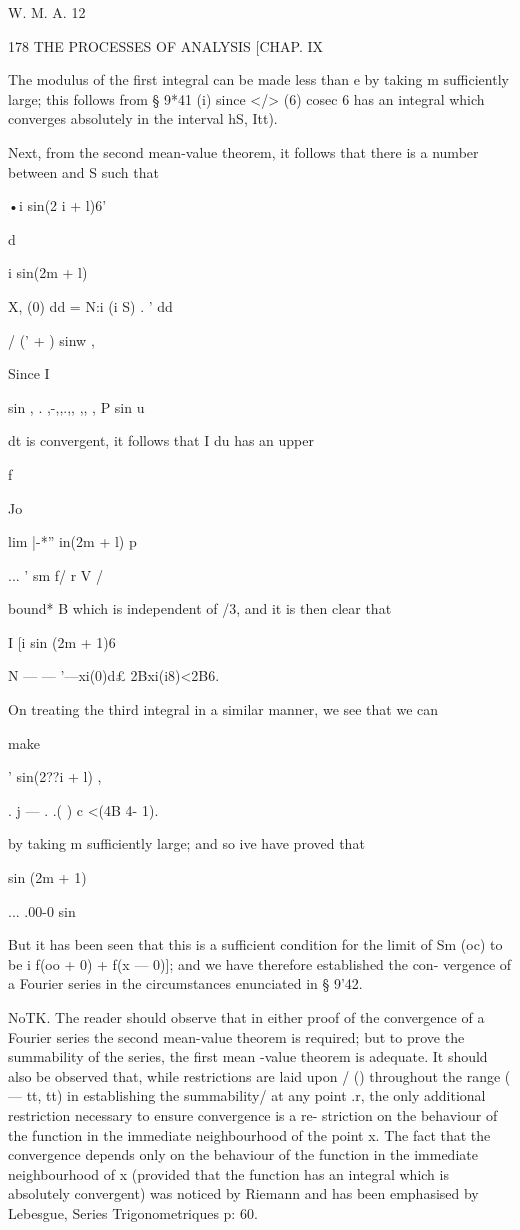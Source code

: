 W. M. A. 12

178 THE PROCESSES OF ANALYSIS [CHAP. IX

The modulus of the first integral can be made less than e by taking m
sufficiently large; this follows from § 9*41 (i) since </> (6) cosec
6 has an integral which converges absolutely in the interval hS, Itt).

Next, from the second mean-value theorem, it follows that there is a
number between and S such that

•i sin(2 i + l)6'

d

i sin(2m + l)

X, (0) dd = N:i (i S) . ' dd

  / (' + ) sinw ,

Since I

sin , . ,-,,.,, ,, , P sin u

dt is convergent, it follows that I du has an upper

f

Jo

lim |-*'' in(2m + l) p

... ' sm f/ r V /

bound* B which is independent of /3, and it is then clear that

I [i sin (2m + 1)6

N — — '—xi(0)d£ 2Bxi(i8)<2B6.

On treating the third integral in a similar manner, we see that we can

make

  ' sin(2??i + l) ,

. j — . .( ) c <(4B 4- 1).

by taking m sufficiently large; and so ive have proved that

sin (2m + 1)

... .00-0 sin

But it has been seen that this is a sufficient condition for the limit
of Sm (oc) to be i f(oo + 0) + f(x — 0)]; and we have therefore
established the con- vergence of a Fourier series in the circumstances
enunciated in § 9'42.

NoTK. The reader should observe that in either proof of the
convergence of a Fourier series the second mean-value theorem is
required; but to prove the summability of the series, the first mean
-value theorem is adequate. It should also be observed that, while
restrictions are laid upon / () throughout the range ( — tt, tt) in
establishing the summability/ at any point .r, the only additional
restriction necessary to ensure convergence is a re- striction on the
behaviour of the function in the immediate neighbourhood of the point
x. The fact that the convergence depends only on the behaviour of the
function in the immediate neighbourhood of x (provided that the
function has an integral which is absolutely convergent) was noticed
by Riemann and has been emphasised by Lebesgue, Series
Trigonometriques p: 60.

